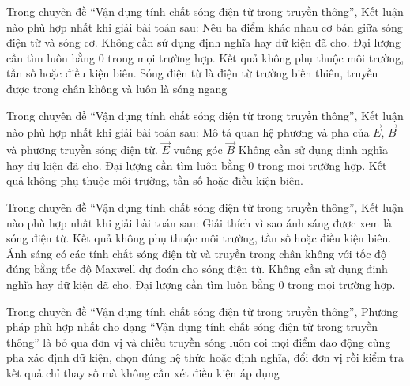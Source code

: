 \begin{ex}
Trong chuyên đề “Vận dụng tính chất sóng điện từ trong truyền thông”, Kết luận nào phù hợp nhất khi giải bài toán sau: Nêu ba điểm khác nhau cơ bản giữa sóng điện từ và sóng cơ.
\choice
{Không cần sử dụng định nghĩa hay dữ kiện đã cho.}
{Đại lượng cần tìm luôn bằng 0 trong mọi trường hợp.}
{Kết quả không phụ thuộc môi trường, tần số hoặc điều kiện biên.}
{\True Sóng điện từ là điện từ trường biến thiên, truyền được trong chân không và luôn là sóng ngang}
\end{ex}

\begin{ex}
Trong chuyên đề “Vận dụng tính chất sóng điện từ trong truyền thông”, Kết luận nào phù hợp nhất khi giải bài toán sau: Mô tả quan hệ phương và pha của $\vec E$, $\vec B$ và phương truyền sóng điện từ.
\choice
{\True $\vec E$ vuông góc $\vec B$}
{Không cần sử dụng định nghĩa hay dữ kiện đã cho.}
{Đại lượng cần tìm luôn bằng 0 trong mọi trường hợp.}
{Kết quả không phụ thuộc môi trường, tần số hoặc điều kiện biên.}
\end{ex}

\begin{ex}
Trong chuyên đề “Vận dụng tính chất sóng điện từ trong truyền thông”, Kết luận nào phù hợp nhất khi giải bài toán sau: Giải thích vì sao ánh sáng được xem là sóng điện từ.
\choice
{Kết quả không phụ thuộc môi trường, tần số hoặc điều kiện biên.}
{\True Ánh sáng có các tính chất sóng điện từ và truyền trong chân không với tốc độ đúng bằng tốc độ Maxwell dự đoán cho sóng điện từ.}
{Không cần sử dụng định nghĩa hay dữ kiện đã cho.}
{Đại lượng cần tìm luôn bằng 0 trong mọi trường hợp.}
\end{ex}

\begin{ex}
Trong chuyên đề “Vận dụng tính chất sóng điện từ trong truyền thông”, Phương pháp phù hợp nhất cho dạng “Vận dụng tính chất sóng điện từ trong truyền thông” là
\choice
{bỏ qua đơn vị và chiều truyền sóng}
{luôn coi mọi điểm dao động cùng pha}
{\True xác định dữ kiện, chọn đúng hệ thức hoặc định nghĩa, đổi đơn vị rồi kiểm tra kết quả}
{chỉ thay số mà không cần xét điều kiện áp dụng}
\end{ex}
